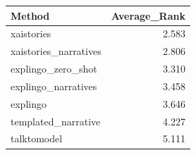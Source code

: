\begin{tabular}{lr}
\toprule
Method & Average_Rank \\
\midrule
xaistories & 2.583 \\
xaistories_narratives & 2.806 \\
explingo_zero_shot & 3.310 \\
explingo_narratives & 3.458 \\
explingo & 3.646 \\
templated_narrative & 4.227 \\
talktomodel & 5.111 \\
\bottomrule
\end{tabular}
